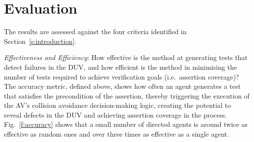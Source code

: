 \documentclass[letterpaper, 10 pt, journal, twoside]{IEEEtran}
\begin{document}



\section{Evaluation}\label{s:evaluation}


The results are assessed against the four criteria identified in Section~\ref{s:introduction}.

\textit{Effectiveness and Efficiency}: How effective is the method at generating tests that detect failures in the DUV, and how efficient is the method in minimising the number of tests required to achieve verification goals (i.e.\ assertion coverage)?
%
The accuracy metric, defined above, shows how often an agent generates a test that satisfies the precondition of the assertion, thereby triggering the execution of the AV's collision avoidance decision-making logic, creating the potential to reveal defects in the DUV and achieving assertion coverage in the process. 
%
Fig.~\ref{f:accuracy} shows that a small number of directed agents is around twice as effective as random ones and over three times as effective as a single agent.

\end{document}
